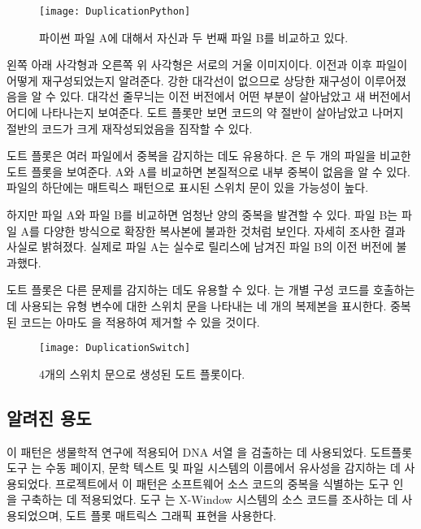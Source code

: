 \documentclass[a4paper,10pt,twoside]{book}
\begin{document}
\begin{figure}[h]
\begin{center}
\texttt{[image: DuplicationPython]}
\caption{파이썬 파일 A에 대해서 자신과 두 번째 파일 B를 비교하고 있다.}
\end{center}
\end{figure}

왼쪽 아래 사각형과 오른쪽 위 사각형은 서로의 거울 이미지이다. 이전과 이후 파일이 어떻게 재구성되었는지 알려준다. 강한 대각선이 없으므로 상당한 재구성이 이루어졌음을 알 수 있다. 대각선 줄무늬는 이전 버전에서 어떤 부분이 살아남았고 새 버전에서 어디에 나타나는지 보여준다. 도트 플롯만 보면 코드의 약 절반이 살아남았고 나머지 절반의 코드가 크게 재작성되었음을 짐작할 수 있다.

도트 플롯은 여러 파일에서 중복을 감지하는 데도 유용하다. 은 두 개의  파일을 비교한 도트 플롯을 보여준다. A와 A를 비교하면 본질적으로 내부 중복이 없음을 알 수 있다. 파일의 하단에는 매트릭스 패턴으로 표시된 스위치 문이 있을 가능성이 높다.

하지만 파일 A와 파일 B를 비교하면 엄청난 양의 중복을 발견할 수 있다. 파일 B는 파일 A를 다양한 방식으로 확장한 복사본에 불과한 것처럼 보인다. 자세히 조사한 결과 사실로 밝혀졌다. 실제로 파일 A는 실수로 릴리스에 남겨진 파일 B의 이전 버전에 불과했다.

도트 플롯은 다른 문제를 감지하는 데도 유용할 수 있다. 는 개별 구성 코드를 호출하는 데 사용되는 유형 변수에 대한 스위치 문을 나타내는 네 개의 복제본을 표시한다. 중복된 코드는 아마도 을 적용하여 제거할 수 있을 것이다.

\begin{figure}
\begin{center}
\texttt{[image: DuplicationSwitch]}
\caption{4개의 스위치 문으로 생성된 도트 플롯이다.}
\end{center}
\end{figure}

\subsection*{알려진 용도}

이 패턴은 생물학적 연구에 적용되어 DNA 서열 \cite{Pust82a}을 검출하는 데 사용되었다. 도트플롯 도구 \cite{Helf95a}는 수동 페이지, 문학 텍스트 및 파일 시스템의 이름에서 유사성을 감지하는 데 사용되었다.  프로젝트에서 이 패턴은 소프트웨어 소스 코드의 중복을 식별하는 도구 \cite{Duca99b}인 을 구축하는 데 적용되었다.  도구 \cite{Bake92a}는 X-Window 시스템의 소스 코드를 조사하는 데 사용되었으며, 도트 플롯 매트릭스 그래픽 표현을 사용한다.
\end{document}
